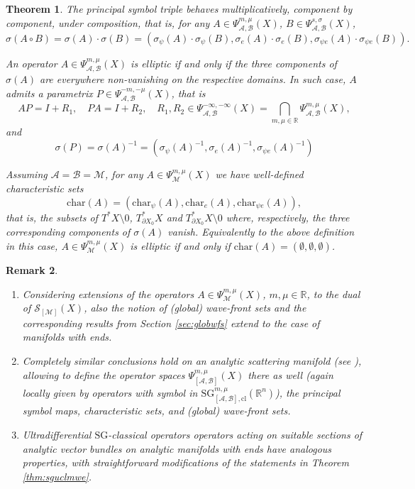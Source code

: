 \documentclass[11pt,reqno]{amsart}
\numberwithin{equation}{section}
\newtheorem{theorem}{Theorem}[section]
\newtheorem{remark}[theorem]{Remark}
\newcommand{\R}{{\mathbb{R}}} %
\newcommand{\SG}{{\mathrm{SG}}}
\newcommand{\M}{{\mathcal{M}}} %
\newcommand{\A}{{\mathcal{A}}} %
\newcommand{\B}{{\mathcal{B}}} %
\begin{document}
\begin{theorem}
The principal symbol triple behaves multiplicatively, component by component, under composition, that is, for any
$A\in\Psi_{\A,\B}^{m,\mu}(X)$, $B\in\Psi_{\A,\B}^{s,\sigma}(X)$,
%
\[
	\sigma(A\circ B)=\sigma(A)\cdot\sigma(B)=(\sigma_\psi(A)\cdot\sigma_\psi(B),\sigma_e(A)\cdot\sigma_e(B),\sigma_{\psi e}(A)\cdot\sigma_{\psi e}(B)).
\]

An operator $A\in\Psi_{\A,\B}^{m,\mu}(X)$ is elliptic if and only if the three components of $\sigma(A)$ are everywhere non-vanishing
on the respective domains. In such case, $A$ admits a parametrix $P\in\Psi_{\A,\B}^{-m,-\mu}(X)$, that is
%
\begin{equation*}\label{eq:paramX}
	AP=I+R_1,\quad PA=I+R_2,\quad R_1,R_2\in\Psi_{\A,\B}^{-\infty,-\infty}(X)=\bigcap_{m,\mu\in\R}\Psi_{\A,\B}^{m,\mu}(X),
\end{equation*}
%
and
%
\[
	\sigma(P)=\sigma(A)^{-1}=(\sigma_\psi(A)^{-1},\sigma_e(A)^{-1},\sigma_{\psi e}(A)^{-1})
\]

Assuming $\A=\B=\M$, for any $A\in\Psi_{\M}^{m,\mu}(X)$ we have well-defined characteristic sets 
%
\[
	\mathrm{char}(A)=(\mathrm{char}_\psi(A), \mathrm{char}_e(A), \mathrm{char}_{\psi e}(A)),
\]
%
that is, the subsets of $T^*X\setminus0$, $T^*_{\partial X_0}X$ and $T^*_{\partial X_0}X\setminus0$ where,
respectively, the three corresponding components of $\sigma(A)$ vanish. Equivalently to the above definition in this
case, $A\in\Psi_{\M}^{m,\mu}(X)$ is elliptic if and only if $\mathrm{char}(A)=(\emptyset,\emptyset,\emptyset)$.
%
\end{theorem}
%
\begin{remark}\ 
	\begin{enumerate}
		\item[  i)] 	Considering extensions of the operators $A\in\Psi_{\M}^{m,\mu}(X)$, $m,\mu\in\R$, to the dual of $\mathcal{S}_{[\M]}(X)$,
				also the notion of (global) wave-front sets and the corresponding results from Section \ref{sec:globwfs} extend to the case of manifolds
				with ends. 
		\item[ ii)] 	Completely similar conclusions hold on an analytic scattering manifold (see \cite{Melrose_GST}),
				allowing to define the operator spaces $\Psi^{m,\mu}_{[\A,\B]}(X)$ there as well (again locally given by operators
				with symbol in ${\SG}_{[\A,\B],\mathrm{cl}}^{m,\mu}(\R^n)$), the principal symbol maps, characteristic sets, and (global) wave-front sets.
		\item[iii)]	Ultradifferential $\SG$-classical operators operators acting on suitable sections of analytic vector bundles on analytic manifolds with ends
				have analogous properties, with straightforward modifications of the statements in Theorem \ref{thm:sguclmwe}.
	\end{enumerate}
\end{remark}



	
	
\end{document}
